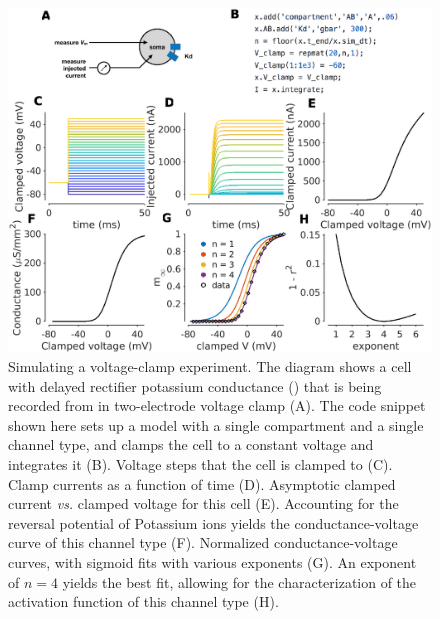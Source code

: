 \documentclass{frontiersSCNS} %
\begin{document}
\begin{figure}[!htb]
	\centering
	\includegraphics[width=1.0\linewidth]{gfx/figure_clamp}
	\caption{Simulating a voltage-clamp experiment. The diagram shows a cell with delayed rectifier potassium conductance (\cite{liuModelNeuronActivityDependent1998}) that is being recorded from in two-electrode voltage clamp (A). The code snippet shown here sets up a model with a single compartment and a single channel type, and clamps the cell to a constant voltage and integrates it (B). Voltage steps that the cell is clamped to (C). Clamp currents as a function of time (D). Asymptotic clamped current {\em vs.} clamped voltage for this cell (E). Accounting for the reversal potential of Potassium ions yields the conductance-voltage curve of this channel type (F). Normalized conductance-voltage curves, with sigmoid fits with various exponents (G). An exponent of $n=4$ yields the best fit, allowing for the characterization of the activation function of this channel type (H). }
	\label{fig:figureclamp}
\end{figure}
\end{document}
